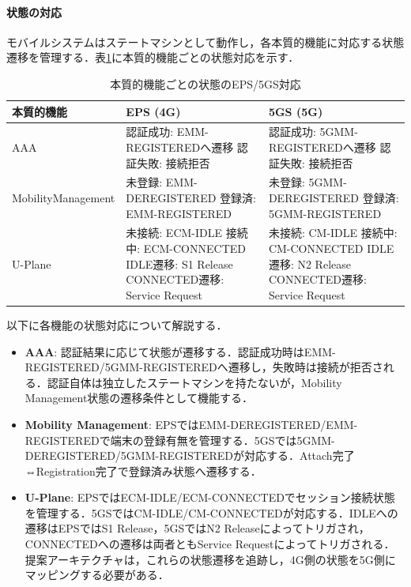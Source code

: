 \paragraph{状態の対応}

モバイルシステムはステートマシンとして動作し，各本質的機能に対応する状態遷移を管理する．表\ref{tab:state_mapping}に本質的機能ごとの状態対応を示す．

\begin{table}[htbp]
\centering
\caption{本質的機能ごとの状態のEPS/5GS対応}
\label{tab:state_mapping}
\begin{tabular}{|p{3cm}|p{5.5cm}|p{5.5cm}|}
\hline
\textbf{本質的機能} & \textbf{EPS (4G)} & \textbf{5GS (5G)} \\
\hline
AAA &
認証成功: EMM-REGISTEREDへ遷移\newline
認証失敗: 接続拒否 &
認証成功: 5GMM-REGISTEREDへ遷移\newline
認証失敗: 接続拒否 \\
\hline
Mobility\newline Management &
未登録: EMM-DEREGISTERED\newline
登録済: EMM-REGISTERED &
未登録: 5GMM-DEREGISTERED\newline
登録済: 5GMM-REGISTERED \\
\hline
U-Plane &
未接続: ECM-IDLE\newline
接続中: ECM-CONNECTED\newline
IDLE遷移: S1 Release\newline
CONNECTED遷移: Service Request &
未接続: CM-IDLE\newline
接続中: CM-CONNECTED\newline
IDLE遷移: N2 Release\newline
CONNECTED遷移: Service Request \\
\hline
\end{tabular}
\end{table}

以下に各機能の状態対応について解説する．

\begin{itemize}
  \item \textbf{AAA}: 認証結果に応じて状態が遷移する．認証成功時はEMM-REGISTERED/5GMM-REGISTEREDへ遷移し，失敗時は接続が拒否される．認証自体は独立したステートマシンを持たないが，Mobility Management状態の遷移条件として機能する．
  \item \textbf{Mobility Management}: EPSではEMM-DEREGISTERED/EMM-REGISTEREDで端末の登録有無を管理する．5GSでは5GMM-DEREGISTERED/5GMM-REGISTEREDが対応する．Attach完了⇔Registration完了で登録済み状態へ遷移する．
  \item \textbf{U-Plane}: EPSではECM-IDLE/ECM-CONNECTEDでセッション接続状態を管理する．5GSではCM-IDLE/CM-CONNECTEDが対応する．IDLEへの遷移はEPSではS1 Release，5GSではN2 Releaseによってトリガされ，CONNECTEDへの遷移は両者ともService Requestによってトリガされる．提案アーキテクチャは，これらの状態遷移を追跡し，4G側の状態を5G側にマッピングする必要がある．
\end{itemize}

